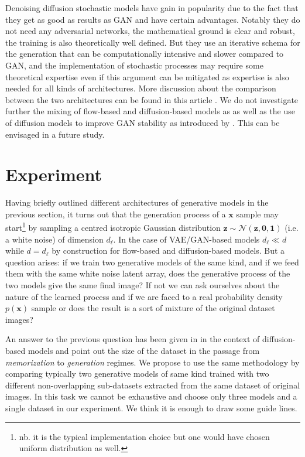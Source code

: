 \documentclass[11pt]{amsart}
\begin{document}
Denoising diffusion stochastic models have gain in popularity due to the fact that they get as good as results as GAN and have certain advantages. Notably they do not need any adversarial networks, the mathematical ground is clear and robust, the training is also theoretically well defined. But they use an iterative schema for the generation that can be computationally intensive and slower compared to GAN, and the implementation of stochastic processes may require some theoretical expertise even if this argument can be mitigated as expertise is also needed for all kinds of architectures. More discussion about the comparison between the two architectures  can be found in this article \cite{dhariwal2021diffusion}. We do not investigate further the mixing of flow-based and diffusion-based models as \citep[e.g.][]{zhang2021diffusion,gong2021interpreting} as well as the use of diffusion models to improve GAN stability as introduced by \cite{Wang2022}. This can be envisaged in a future study.
%
\section{Experiment}
%
Having briefly outlined different architectures of generative models in the previous section, it turns out that the generation process of a $\bm{x}$ sample may start\footnote{nb. it is the typical implementation choice but one would have chosen uniform distribution as well.} by sampling a centred isotropic Gaussian distribution $\bm{z}\sim \mathcal{N}(\bm{z},\bm{0},\bm{1})$ (i.e. a white noise) of dimension $d_\ell$. In the case of VAE/GAN-based models $d_\ell\ll d$ while $d=d_\ell$ by construction for flow-based and diffusion-based models. But a question arises: if we train two generative models of the same kind, and if we feed them with the same white noise latent array, does the generative process of the two models give the same final image? If not we can ask ourselves about the nature of the learned process and if we are faced to a real probability density $p(\bm{x})$ sample or does the result is a sort of mixture of the original dataset images? 

An answer to the previous question has been given in \cite{kadkhodaie2024generalization} in the context of diffusion-based models and point out the size of the dataset in the passage from \textit{memorization} to \textit{generation} regimes. We propose to use the same methodology by comparing typically two generative models of same kind trained with two different non-overlapping sub-datasets extracted from the same dataset of original images. In this task we cannot be exhaustive and choose only three models and a single dataset in our experiment. We think it is enough to draw some guide lines.
%
\end{document}

